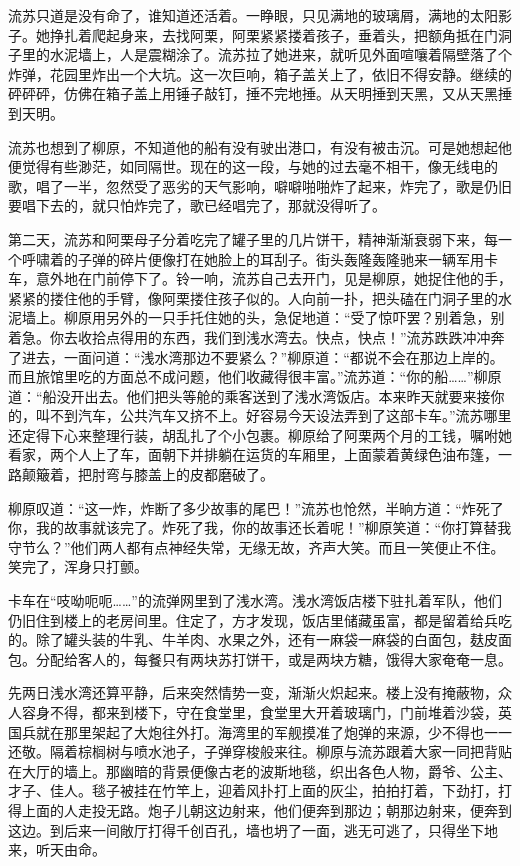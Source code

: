 \par 流苏只道是没有命了，谁知道还活着。一睁眼，只见满地的玻璃屑，满地的太阳影子。她挣扎着爬起身来，去找阿栗，阿栗紧紧搂着孩子，垂着头，把额角抵在门洞子里的水泥墙上，人是震糊涂了。流苏拉了她进来，就听见外面喧嚷着隔壁落了个炸弹，花园里炸出一个大坑。这一次巨响，箱子盖关上了，依旧不得安静。继续的砰砰砰，仿佛在箱子盖上用锤子敲钉，捶不完地捶。从天明捶到天黑，又从天黑捶到天明。
\par 流苏也想到了柳原，不知道他的船有没有驶出港口，有没有被击沉。可是她想起他便觉得有些渺茫，如同隔世。现在的这一段，与她的过去毫不相干，像无线电的歌，唱了一半，忽然受了恶劣的天气影响，噼噼啪啪炸了起来，炸完了，歌是仍旧要唱下去的，就只怕炸完了，歌已经唱完了，那就没得听了。
\par 第二天，流苏和阿栗母子分着吃完了罐子里的几片饼干，精神渐渐衰弱下来，每一个呼啸着的子弹的碎片便像打在她脸上的耳刮子。街头轰隆轰隆驰来一辆军用卡车，意外地在门前停下了。铃一响，流苏自己去开门，见是柳原，她捉住他的手，紧紧的搂住他的手臂，像阿栗搂住孩子似的。人向前一扑，把头磕在门洞子里的水泥墙上。柳原用另外的一只手托住她的头，急促地道：“受了惊吓罢？别着急，别着急。你去收拾点得用的东西，我们到浅水湾去。快点，快点！”流苏跌跌冲冲奔了进去，一面问道：“浅水湾那边不要紧么？”柳原道：“都说不会在那边上岸的。而且旅馆里吃的方面总不成问题，他们收藏得很丰富。”流苏道：“你的船……”柳原道：“船没开出去。他们把头等舱的乘客送到了浅水湾饭店。本来昨天就要来接你的，叫不到汽车，公共汽车又挤不上。好容易今天设法弄到了这部卡车。”流苏哪里还定得下心来整理行装，胡乱扎了个小包裹。柳原给了阿栗两个月的工钱，嘱咐她看家，两个人上了车，面朝下并排躺在运货的车厢里，上面蒙着黄绿色油布篷，一路颠簸着，把肘弯与膝盖上的皮都磨破了。
\par 柳原叹道：“这一炸，炸断了多少故事的尾巴！”流苏也怆然，半晌方道：“炸死了你，我的故事就该完了。炸死了我，你的故事还长着呢！”柳原笑道：“你打算替我守节么？”他们两人都有点神经失常，无缘无故，齐声大笑。而且一笑便止不住。笑完了，浑身只打颤。
\par 卡车在“吱呦呃呃……”的流弹网里到了浅水湾。浅水湾饭店楼下驻扎着军队，他们仍旧住到楼上的老房间里。住定了，方才发现，饭店里储藏虽富，都是留着给兵吃的。除了罐头装的牛乳、牛羊肉、水果之外，还有一麻袋一麻袋的白面包，麸皮面包。分配给客人的，每餐只有两块苏打饼干，或是两块方糖，饿得大家奄奄一息。
\par 先两日浅水湾还算平静，后来突然情势一变，渐渐火炽起来。楼上没有掩蔽物，众人容身不得，都来到楼下，守在食堂里，食堂里大开着玻璃门，门前堆着沙袋，英国兵就在那里架起了大炮往外打。海湾里的军舰摸准了炮弹的来源，少不得也一一还敬。隔着棕榈树与喷水池子，子弹穿梭般来往。柳原与流苏跟着大家一同把背贴在大厅的墙上。那幽暗的背景便像古老的波斯地毯，织出各色人物，爵爷、公主、才子、佳人。毯子被挂在竹竿上，迎着风扑打上面的灰尘，拍拍打着，下劲打，打得上面的人走投无路。炮子儿朝这边射来，他们便奔到那边；朝那边射来，便奔到这边。到后来一间敞厅打得千创百孔，墙也坍了一面，逃无可逃了，只得坐下地来，听天由命。
